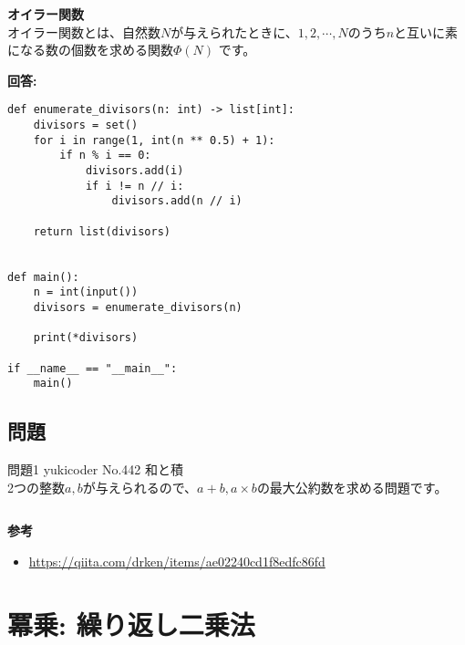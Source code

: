 \documentclass{jlreq}
\begin{document}
\newpage
\begin{tcolorbox}[enhanced,
    colback=white!85!gray,
    drop fuzzy shadow,
    boxrule=0.3mm,
    arc=0mm,
    left=0pt,
    top=0pt,
    sharp corners,
    width=\textwidth,
    ]
    \textbf{オイラー関数} \\
    オイラー関数とは、自然数$N$が与えられたときに、$1, 2, \cdots, N$のうち$n$と互いに素になる数の個数を求める関数$\Phi(N)$
    です。
  \tcblower
  
  \begin{tcolorbox}[
    coltext=white!10!blue,
    colback=white!90!purple!90!blue,
    drop fuzzy shadow,
    boxrule=0mm,
    arc=0mm,
    width=1.3cm,
    left=0pt,
    right=0pt,
    top=0pt,
    bottom=0pt,
    halign=flush left,
  ]
  \end{tcolorbox}
  \tcblower
  \textbf{回答:}
  \begin{lstlisting}
def enumerate_divisors(n: int) -> list[int]:
    divisors = set()
    for i in range(1, int(n ** 0.5) + 1):
        if n % i == 0:
            divisors.add(i)
            if i != n // i:
                divisors.add(n // i)
    
    return list(divisors)


def main():
    n = int(input())
    divisors = enumerate_divisors(n)
    
    print(*divisors)
    
if __name__ == "__main__":
    main()

  \end{lstlisting}
  \end{tcolorbox}%

\subsection{問題}

問題1  yukicoder No.442 和と積 \\
2つの整数$a, b$が与えられるので、$a + b, a \times b$の最大公約数を求める問題です。
\begin{lstlisting}[caption=2点間の格子点の個数の実装, label=grid, frame=TRBL]
\end{lstlisting}

\textbf{参考}

\begin{itemize}
    \item \url{https://qiita.com/drken/items/ae02240cd1f8edfc86fd}
\end{itemize}

\section{冪乗: 繰り返し二乗法}
\end{document}
